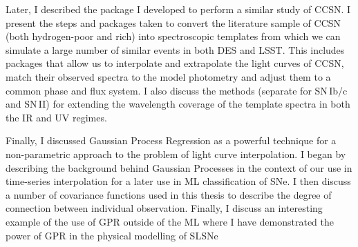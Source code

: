 Later, I described the package I developed to perform a similar study of CCSN. I present the steps and packages taken to convert the literature sample of CCSN (both hydrogen-poor and rich) into spectroscopic templates from which we can simulate a large number of similar events in both DES and LSST. This includes packages that allow us to interpolate and extrapolate the light curves of CCSN, match their observed spectra to the model photometry and adjust them to a common phase and flux system. I also discuss the methods (separate for SN\,Ib/c and SN\,II) for extending the wavelength coverage of the template spectra in both the IR and UV regimes.

Finally, I discussed Gaussian Process Regression as a powerful technique for a non-parametric approach to the problem of light curve interpolation. I began by describing the background behind Gaussian Processes in the context of our use in time-series interpolation for a later use in ML classification of SNe. I then discuss a number of covariance functions used in this thesis to describe the degree of connection between individual observation. Finally, I discuss an interesting example of the use of GPR outside of the ML where I have demonstrated the power of GPR in the physical modelling of SLSNe
